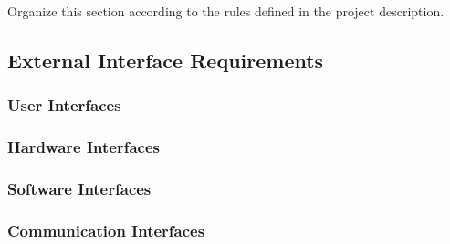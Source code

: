 Organize this section according to the rules defined in the project description. 
\subsection{External Interface Requirements}
\subsubsection{User Interfaces}
\subsubsection{Hardware Interfaces}
\subsubsection{Software Interfaces}
\subsubsection{Communication Interfaces}


